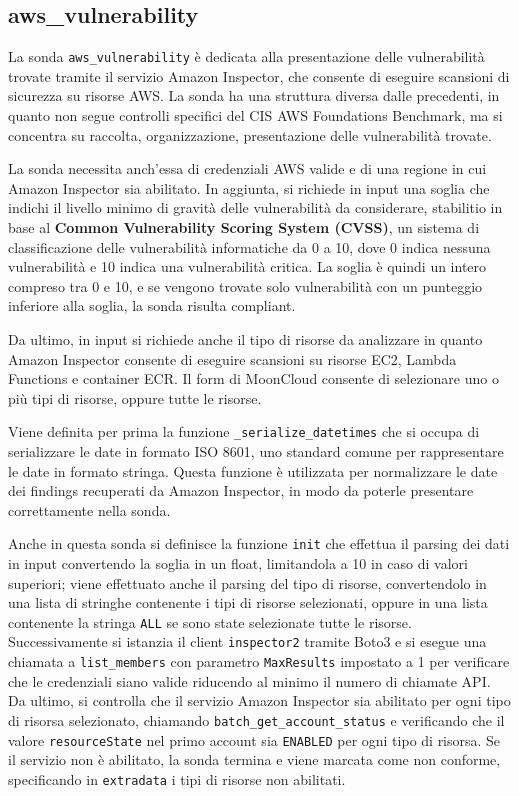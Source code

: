 \subsection{aws\_vulnerability}
\label{sec:vulnerability}

La sonda \texttt{aws\_vulnerability} è dedicata alla presentazione delle vulnerabilità trovate tramite il servizio Amazon Inspector, che consente di eseguire scansioni di sicurezza su risorse AWS. La sonda ha una struttura diversa dalle precedenti, in quanto non segue controlli specifici del CIS AWS Foundations Benchmark, ma si concentra su raccolta, organizzazione, presentazione delle vulnerabilità trovate.

La sonda necessita anch'essa di credenziali AWS valide e di una regione in cui Amazon Inspector sia abilitato. In aggiunta, si richiede in input una soglia che indichi il livello minimo di gravità delle vulnerabilità da considerare, stabilitio in base al \textbf{Common Vulnerability Scoring System (CVSS)}, un sistema di classificazione delle vulnerabilità informatiche da 0 a 10, dove 0 indica nessuna vulnerabilità e 10 indica una vulnerabilità critica. La soglia è quindi un intero compreso tra 0 e 10, e se vengono trovate solo vulnerabilità con un punteggio inferiore alla soglia, la sonda risulta compliant.

Da ultimo, in input si richiede anche il tipo di risorse da analizzare in quanto Amazon Inspector consente di eseguire scansioni su risorse EC2, Lambda Functions e container ECR. Il form di MoonCloud consente di selezionare uno o più tipi di risorse, oppure tutte le risorse. 

Viene definita per prima la funzione \texttt{\_serialize\_datetimes} che si occupa di serializzare le date in formato ISO 8601, uno standard comune per rappresentare le date in formato stringa. Questa funzione è utilizzata per normalizzare le date dei findings recuperati da Amazon Inspector, in modo da poterle presentare correttamente nella sonda.

Anche in questa sonda si definisce la funzione \texttt{init} che effettua il parsing dei dati in input convertendo la soglia in un float, limitandola a 10 in caso di valori superiori; viene effettuato anche il parsing del tipo di risorse, convertendolo in una lista di stringhe contenente i tipi di risorse selezionati, oppure in una lista contenente la stringa \texttt{ALL} se sono state selezionate tutte le risorse. Successivamente si istanzia il client \texttt{inspector2} tramite Boto3 e si esegue una chiamata a \texttt{list\_members} con parametro \texttt{MaxResults} impostato a 1 per verificare che le credenziali siano valide riducendo al minimo il numero di chiamate API. Da ultimo, si controlla che il servizio Amazon Inspector sia abilitato per ogni tipo di risorsa selezionato, chiamando \texttt{batch\_get\_account\_status} e verificando che il valore \texttt{resourceState} nel primo account sia \texttt{ENABLED} per ogni tipo di risorsa. Se il servizio non è abilitato, la sonda termina e viene marcata come non conforme, specificando in \texttt{extradata} i tipi di risorse non abilitati. 

